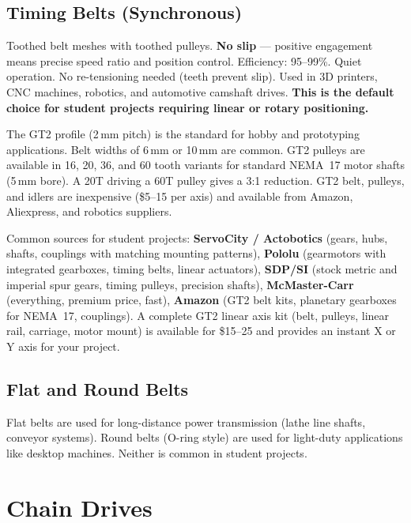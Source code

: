 \documentclass[11pt,letterpaper,twoside,openany]{book}
\begin{document}
\subsection{Timing Belts (Synchronous)}
Toothed belt meshes with toothed pulleys. \textbf{No slip} --- positive engagement means precise speed ratio and position control. Efficiency: 95--99\%. Quiet operation. No re-tensioning needed (teeth prevent slip). Used in 3D printers, CNC machines, robotics, and automotive camshaft drives. \textbf{This is the default choice for student projects requiring linear or rotary positioning.}

\begin{tipbox}
The GT2 profile (2\,mm pitch) is the standard for hobby and prototyping applications. Belt widths of 6\,mm or 10\,mm are common. GT2 pulleys are available in 16, 20, 36, and 60 tooth variants for standard NEMA~17 motor shafts (5\,mm bore). A 20T driving a 60T pulley gives a 3:1 reduction. GT2 belt, pulleys, and idlers are inexpensive (\$5--15 per axis) and available from Amazon, Aliexpress, and robotics suppliers.
\end{tipbox}

\begin{tipbox}
Common sources for student projects: \textbf{ServoCity / Actobotics} (gears, hubs, shafts, couplings with matching mounting patterns), \textbf{Pololu} (gearmotors with integrated gearboxes, timing belts, linear actuators), \textbf{SDP/SI} (stock metric and imperial spur gears, timing pulleys, precision shafts), \textbf{McMaster-Carr} (everything, premium price, fast), \textbf{Amazon} (GT2 belt kits, planetary gearboxes for NEMA~17, couplings). A complete GT2 linear axis kit (belt, pulleys, linear rail, carriage, motor mount) is available for \$15--25 and provides an instant X or Y axis for your project.
\end{tipbox}

\subsection{Flat and Round Belts}
Flat belts are used for long-distance power transmission (lathe line shafts, conveyor systems). Round belts (O-ring style) are used for light-duty applications like desktop machines. Neither is common in student projects.

\FloatBarrier
\section{Chain Drives}
\end{document}
